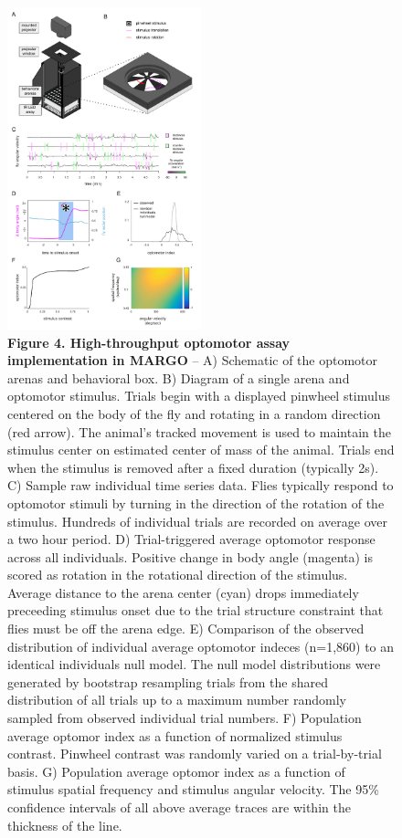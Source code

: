 \documentclass[10pt]{article}
\begin{document}
\newpage
\begin{figure}[h!]
	\begin{center}
		\includegraphics[width=0.5\textwidth]{../figures/Optomotor_panel.pdf}
	\end{center}
	\caption*{\footnotesize \textbf{Figure 4. High-throughput optomotor assay implementation in MARGO} -- A) Schematic of the optomotor arenas and behavioral box. B) Diagram of a single arena and optomotor stimulus. Trials begin with a displayed pinwheel stimulus centered on the body of the fly and rotating in a random direction (red arrow). The animal's tracked movement is used to maintain the stimulus center on estimated center of mass of the animal. Trials end when the stimulus is removed after a fixed duration (typically 2s). C) Sample raw individual time series data. Flies typically respond to optomotor stimuli by turning in the direction of the rotation of the stimulus. Hundreds of individual trials are recorded on average over a two hour period. D) Trial-triggered average optomotor response across all individuals. Positive change in body angle (magenta) is scored as rotation in the rotational direction of the stimulus. Average distance to the arena center (cyan) drops immediately preceeding stimulus onset due to the trial structure constraint that flies must be off the arena edge. E) Comparison of the observed distribution of individual average optomotor indeces (n=1,860) to an identical individuals null model. The null model distributions were generated by bootstrap resampling trials from the shared distribution of all trials up to a maximum number randomly sampled from observed individual trial numbers. F) Population average optomor index as a function of normalized stimulus contrast. Pinwheel contrast was randomly varied on a trial-by-trial basis. G) Population average optomor index as a function of stimulus spatial frequency and stimulus angular velocity. The 95\% confidence intervals of all above average traces are within the thickness of the line.}
\end{figure}
\end{document}
